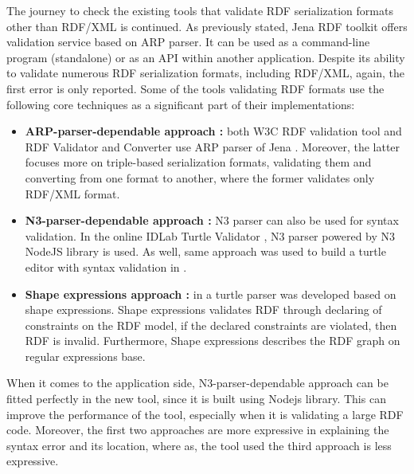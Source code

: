 The journey to check the existing tools that validate RDF serialization formats other than RDF/XML is continued. As previously stated, Jena RDF toolkit \citep{McBride:2002:JSW:613357.613755} offers validation service based on ARP parser. It can be used as a command-line program (standalone) or as an API within another application. Despite its ability to validate numerous RDF serialization formats, including RDF/XML, again, the first error is only reported. Some of the tools validating RDF formats use the following core techniques as a significant part of their implementations:
\begin{itemize}[noitemsep] 
\item \textbf{ARP-parser-dependable approach :} both W3C RDF validation tool \citep{W3C:Validation:Online} and RDF Validator and Converter \citep{Mybluemix:Validation:Online} use ARP parser of Jena \citep{McBride:2002:JSW:613357.613755}. Moreover, the latter focuses more on triple-based serialization formats, validating them and converting from one format to another, where the former validates only RDF/XML format. 
\item \textbf{N3-parser-dependable approach :} N3 parser can also be used for syntax validation. In the online IDLab Turtle Validator \citep{IDLab:Validation:Online}, N3 parser powered by N3 NodeJS library is used. As well, same approach was used to build a turtle editor with syntax validation in \citep{petersenturtleeditor}. 
\item \textbf{Shape expressions approach :} in \citep{prud2014shape} a turtle parser was developed based on shape expressions. Shape expressions validates RDF through declaring of constraints on the RDF model, if the declared constraints are violated, then RDF is invalid. Furthermore, Shape expressions describes the RDF graph on regular expressions base. 
\end{itemize} 

When it comes to the application side, N3-parser-dependable approach can be fitted perfectly in the new tool, since it is built using Nodejs library. This can improve the performance of the tool, especially when it is validating a large RDF code. Moreover, the first two approaches are more expressive in explaining the syntax error and its location, where as, the tool used the third approach is less expressive.


